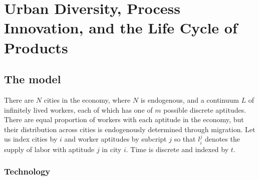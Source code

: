 \chapter{Urban Diversity, Process Innovation, and the Life Cycle of Products}

\section{The model}

There are $N$ cities in the economy, where $N$ is endogenous, and a continuum $L$ of infinitely lived workers, each of which has one of $m$ possible discrete aptitudes. There are equal proportion of workers with each aptitude in the economy, but their distribution across cities is endogenously determined through migration. Let us index cities by $i$ and worker aptitudes by subcript $j$ so that $l_i^j$ denotes the supply of labor with aptitude $j$ in city $i$. Time is discrete and indexed by $t$.

\subsection{Technology}

